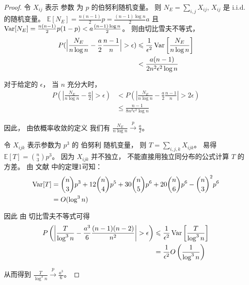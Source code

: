 \begin{proof}
		令 $X_{ij}$ 表示
    参数 为 $p$ 的伯努利随机变量。
     则 $N_E
    = \sum_{i,j} X_{ij}$, $X_{ij}$ 是 i.i.d.
    的随机变量。
	$\mathbb{E}[N_E] = \frac{n(n-1)}{2}p = \frac{(n-1)\log n}{2}a$ 
  且  $\operatorname{\mathrm{Var}}[N_E] = \frac{n(n-1)}{2} p(1-p) < a\frac{(n-1)\log n}{2}$。
	则由切比雪夫不等式，
	\begin{align*}
	P(\Big|\frac{N_E}{n \log n } - \frac{a}{2} \frac{n-1}{n}\Big| > \epsilon) & \leqslant
	\frac{1}{\epsilon^2}\operatorname{\mathrm{Var}} \left[\frac{N_E } {n \log n } \right] \\
	& < \frac{a(n-1)}{2n^2\epsilon^2\log n}
	\end{align*}
	
	对于给定的 $\epsilon$， 当 $n$ 充分大时，
  \begin{align*}
	P \left(\left|\frac{N_E}{n \log n } - \frac{a}{2} \right| > \epsilon \right) & <
	P \left(\left|\frac{N_E}{n \log n } - \frac{a}{2} \frac{n-1}{n}\right| > 2\epsilon \right) \\
	& \leq \frac{n-1}{8n^2 \epsilon^2 \log n}
	\end{align*}
	
	因此， 由依概率收敛的定义
  我们有 $\frac{N_E}{n \log n} \xrightarrow{p} \frac{a}{2}$。
	
	令 $X_{ijk}$ 表示参数为  $p^3$ 的 伯努利 随机变量，
	则 $T = \sum_{i,j,k} X_{ijk}$。
	易得 $\mathbb{E}[T] = \binom{n}{3}p^3$。
  因为 $X_{ijk}$ 并不独立，
  不能直接用独立同分布的公式计算 $T$ 的方差。
	由 文献  中的定理1可知：
	\begin{align*}
	\operatorname{\mathrm{Var}}[T]  &= \binom{n}{3} p^3 + 12 \binom{n}{4} p^5 + 30 \binom{n}{5} p^6 + 20 \binom{n}{6} p^6
	 - \binom{n}{3}^2 p^6  \\ 
   &= O(\log^3 n)
	\end{align*}
	
	因此
	由 切比雪夫不等式可得
	\begin{align*}
	P \left (\left|\frac{T}{\log^3 n } - \frac{a^3}{6} \frac{(n-1)(n-2)}{n^2}\right| > \epsilon \right)
   &\leqslant \frac{1}{\epsilon^2} \operatorname{\mathrm{Var}} \left[ \frac{T}{\log^3 n} \right]\\ 
	& = \frac{1}{\epsilon^2}O \left(\frac{1}{\log^3 n} \right)
	\end{align*}
	    
	从而得到 $\frac{T}{\log^3 n} \xrightarrow{p} \frac{a^3}{6}$。
\end{proof}
